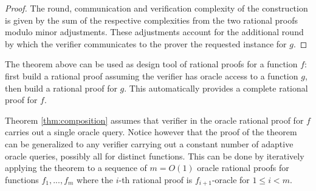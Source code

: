 \begin{proof}
The round, communication and verification complexity of the construction is given by the sum of the respective complexities from the two rational proofs modulo minor adjustments. These adjustments account for the additional round by which the verifier communicates to the prover the requested instance for $g$. 

\begin{comment}
One final note: in the proof above we replaced the oracle query to $g$ with an invocation of the rational proof for it. In certain circumstances (see for example the proof of Theorem \ref{thm:crhf-p}), it would simplify a proof to assume that some of the messages of the rational proof for $g$ are sent before the protocol for $f$ is invoked.
The analysis above still holds if extending the rational proof for $f$ with such "preprocessing" messages still yields a $g$-oracle rational proof for $f$.
\end{comment}
\end{proof}

The theorem above can be used as design tool of rational proofs for a function $f$: first build a rational proof assuming the verifier has oracle access to a function $g$, then build a rational proof for $g$. This automatically provides a complete rational proof for $f$.

\begin{remark}
	Theorem \ref{thm:composition} assumes that verifier in the oracle rational proof for $f$ carries out a single oracle query. Notice however that the proof of the theorem can be generalized to any verifier carrying out a constant number of adaptive oracle queries, possibly all for distinct functions.
	This can be done by iteratively applying the theorem to a sequence of $m = O(1)$ oracle rational proofs for functions $f_1,...,f_m$ where the $i$-th rational proof is $f_{i+1}$-oracle for $1 \leq i < m$.
\end{remark}
